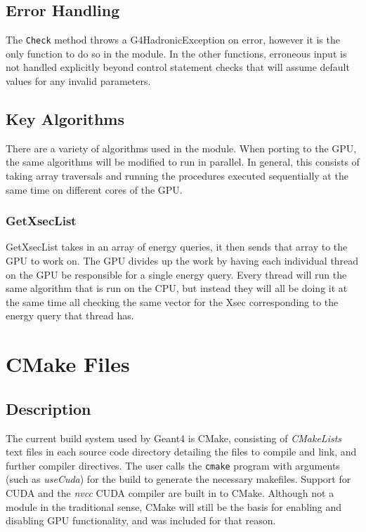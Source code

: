 \documentclass[12pt]{article}
\begin{document}
\subsection{Error Handling}
The \texttt{Check} method throws a G4HadronicException on error, however it is the only function to do so in the module. In the other functions, erroneous input is not handled explicitly beyond control statement checks that will assume default values for any invalid parameters.

\subsection{Key Algorithms}
There are a variety of algorithms used in the module. When porting to the GPU, the same algorithms will be modified to run in parallel. In general, this consists of taking array traversals and running the procedures executed sequentially at the same time on different cores of the GPU. 

\subsubsection{GetXsecList}
GetXsecList takes in an array of energy queries, it then sends that array to the GPU to work on. The GPU divides up the work by having each individual thread on the GPU be responsible for a single energy query. Every thread will run the same algorithm that is run on the CPU, but instead they will all be doing it at the same time all checking the same vector for the Xsec corresponding to the energy query that thread has. 



\section{CMake Files}
\subsection{Description}\label{Sec_CMakeDesc}
The current build system used by Geant4 is CMake, consisting of \emph{CMakeLists} text files in each source code directory detailing the files to compile and link, and further compiler directives. The user calls the \texttt{cmake} program with arguments (such as \emph{useCuda}) for the build to generate the necessary makefiles. Support for CUDA and the \emph{nvcc} CUDA compiler are built in to CMake. Although not a module in the traditional sense, CMake will still be the basis for enabling and disabling GPU functionality, and was included for that reason.
\end{document}
